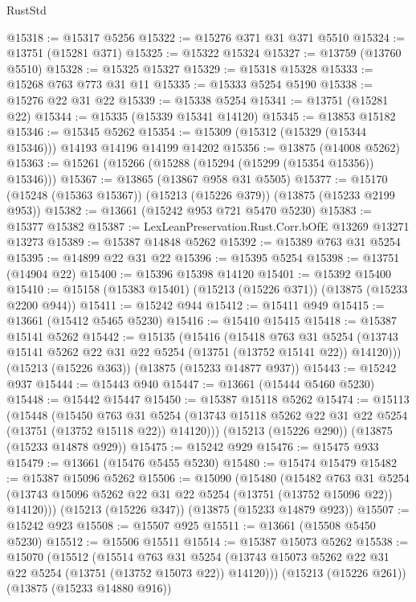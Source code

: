 \begin{lexlean}{RustStd}
\begin{coremodule}
@15318 := @15317 @5256
@15322 := @15276 @371 @31 @371 @5510
@15324 := @13751 (@15281 @371)
@15325 := @15322 @15324
@15327 := @13759 (@13760 @5510)
@15328 := @15325 @15327
@15329 := @15318 @15328
@15333 := @15268 @763 @773 @31 @11
@15335 := @15333 @5254 @5190
@15338 := @15276 @22 @31 @22
@15339 := @15338 @5254
@15341 := @13751 (@15281 @22)
@15344 := @15335 (@15339 @15341 @14120)
@15345 := @13853 @15182
@15346 := @15345 @5262
@15354 := @15309 (@15312 (@15329 (@15344 @15346))) @14193 @14196 @14199 @14202
@15356 := @13875 (@14008 @5262)
@15363 := @15261 (@15266 (@15288 (@15294 (@15299 (@15354 @15356)) @15346)))
@15367 := @13865 (@13867 @958 @31 @5505)
@15377 := @15170 (@15248 (@15363 @15367)) (@15213 (@15226 @379)) (@13875 (@15233 @2199 @953))
@15382 := @13661 (@15242 @953 @721 @5470 @5230)
@15383 := @15377 @15382
@15387 := LexLeanPreservation.Rust.Corr.bOfE @13269 @13271 @13273
@15389 := @15387 @14848 @5262
@15392 := @15389 @763 @31 @5254
@15395 := @14899 @22 @31 @22
@15396 := @15395 @5254
@15398 := @13751 (@14904 @22)
@15400 := @15396 @15398 @14120
@15401 := @15392 @15400
@15410 := @15158 (@15383 @15401) (@15213 (@15226 @371)) (@13875 (@15233 @2200 @944))
@15411 := @15242 @944
@15412 := @15411 @949
@15415 := @13661 (@15412 @5465 @5230)
@15416 := @15410 @15415
@15418 := @15387 @15141 @5262
@15442 := @15135
    (@15416
      (@15418
        @763
        @31
        @5254
        (@13743 @15141 @5262 @22 @31 @22 @5254 (@13751 (@13752 @15141 @22)) @14120)))
    (@15213 (@15226 @363))
    (@13875 (@15233 @14877 @937))
@15443 := @15242 @937
@15444 := @15443 @940
@15447 := @13661 (@15444 @5460 @5230)
@15448 := @15442 @15447
@15450 := @15387 @15118 @5262
@15474 := @15113
    (@15448
      (@15450
        @763
        @31
        @5254
        (@13743 @15118 @5262 @22 @31 @22 @5254 (@13751 (@13752 @15118 @22)) @14120)))
    (@15213 (@15226 @290))
    (@13875 (@15233 @14878 @929))
@15475 := @15242 @929
@15476 := @15475 @933
@15479 := @13661 (@15476 @5455 @5230)
@15480 := @15474 @15479
@15482 := @15387 @15096 @5262
@15506 := @15090
    (@15480
      (@15482
        @763
        @31
        @5254
        (@13743 @15096 @5262 @22 @31 @22 @5254 (@13751 (@13752 @15096 @22)) @14120)))
    (@15213 (@15226 @347))
    (@13875 (@15233 @14879 @923))
@15507 := @15242 @923
@15508 := @15507 @925
@15511 := @13661 (@15508 @5450 @5230)
@15512 := @15506 @15511
@15514 := @15387 @15073 @5262
@15538 := @15070
    (@15512
      (@15514
        @763
        @31
        @5254
        (@13743 @15073 @5262 @22 @31 @22 @5254 (@13751 (@13752 @15073 @22)) @14120)))
    (@15213 (@15226 @261))
    (@13875 (@15233 @14880 @916))

\end{coremodule}
\end{lexlean}
